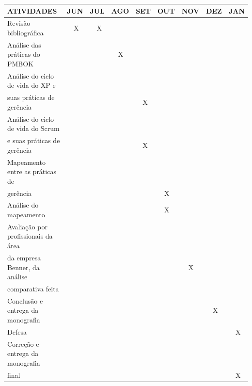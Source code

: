\documentclass[
    12pt,               %
    openright,          %
    twoside,            %
    a4paper,            %
    chapter=TITLE,     %
    english,            %
    spanish,            %
    portuguese              %
    ]{abntex2}
\begin{document}
\begin{table}[h]
\centering
\begin{tabular}{|l|l|l|l|l|l|l|l|l|} \hline
ATIVIDADES                             &JUN & JUL & AGO & SET & OUT & NOV & DEZ & JAN  \\ \hline\hline
Revisão bibliográfica                  &\ \ X &\ \ X &   &     &     &     &     &     \\ \hline
Análise das práticas do PMBOK          &     &     &\ \ X &    &     &     &     &     \\ \hline
Análise do ciclo de vida do XP e 	   &	 &	   &	 &	   &	 &	   &	 &	    \\
suas práticas de gerência              &     &     &     &\ \ X &    &     &     &     \\ \hline
Análise do ciclo de vida do Scrum 	   &	 &	   &	 &	   &	 &	   &	 &      \\
e suas práticas de gerência            &     &     &     &\ \ X &    &     &     &     \\ \hline
Mapeamento entre as práticas de        &     &     &     &     &     &     &     &      \\
gerência                               &     &     &     &     &\ \ X &    &     &     \\ \hline
Análise do mapeamento                  &     &     &     &     &\ \ X &    &     &     \\ \hline
Avaliação por profissionais da área    &     &     &     &     &     &     &     &      \\
da empresa Benner, da análise          &     &     &     &     &     &\ \ X &    &     \\ 
comparativa feita                      &     &     &     &     &     &     &     &      \\ \hline
Conclusão e entrega da monografia      &     &     &     &     &     &     &\ \ X &     \\ \hline
Defesa                                 &     &     &     &     &     &     &     &\ \ X \\ \hline
Correção e entrega da monografia       &     &     &     &     &     &     &     &      \\
final                                  &     &     &     &     &     &     &     &\ \ X  \\ \hline
\end{tabular}
\end{table}


\end{document}
